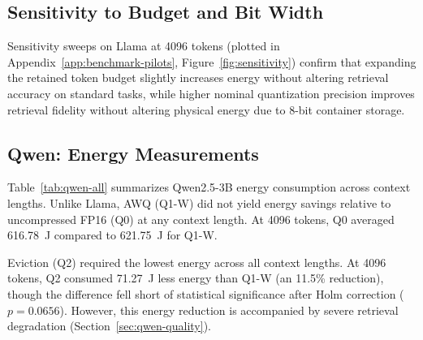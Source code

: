 \documentclass[sigconf,nonacm]{acmart}
\begin{document}
\subsection{Sensitivity to Budget and Bit Width}

Sensitivity sweeps on Llama at 4096 tokens (plotted in Appendix~\ref{app:benchmark-pilots}, Figure~\ref{fig:sensitivity}) confirm that expanding the retained token budget slightly increases energy without altering retrieval accuracy on standard tasks, while higher nominal quantization precision improves retrieval fidelity without altering physical energy due to 8-bit container storage.

\subsection{Qwen: Energy Measurements}
\label{sec:qwen-energy}

Table~\ref{tab:qwen-all} summarizes Qwen2.5-3B energy consumption across context lengths. Unlike Llama, AWQ (Q1-W) did not yield energy savings relative to uncompressed FP16 (Q0) at any context length. At 4096 tokens, Q0 averaged 616.78~J compared to 621.75~J for Q1-W.

\begin{table}[htbp]
\caption{Qwen Energy (J, mean $\pm$ SD) Across Contexts}
\label{tab:qwen-all}
\centering\small
{}
\end{table}

Eviction (Q2) required the lowest energy across all context lengths. At 4096 tokens, Q2 consumed 71.27~J less energy than Q1-W (an 11.5\% reduction), though the difference fell short of statistical significance after Holm correction ($p = 0.0656$). However, this energy reduction is accompanied by severe retrieval degradation (Section~\ref{sec:qwen-quality}).
\end{document}
